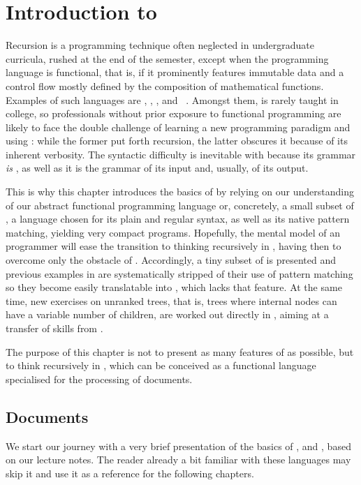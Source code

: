 \chapter{Introduction to \XSLT}

Recursion is a programming technique often neglected in undergraduate
curricula, rushed at the end of the semester, except when the
programming language is functional, that is, if it prominently
features immutable data and a control flow mostly defined by the
composition of mathematical functions. Examples of such languages are
\Scheme, \Haskell, \OCaml, \Erlang and \XSLT~\citep{Kay_2008}. Amongst
them, \XSLT is rarely taught in college, so professionals without
prior exposure to functional programming are likely to face the double
challenge of learning a new programming paradigm and using \XML: while
the former put forth recursion, the latter obscures it because of its
inherent verbosity. The syntactic difficulty is inevitable with \XSLT
because its grammar \emph{is} \XML, as well as it is the grammar of
its input and, usually, of its output.

This is why this chapter introduces the basics of \XSLT by relying on
our understanding of our abstract functional programming language or,
concretely, a small subset of \Erlang, a language chosen for its plain
and regular syntax, as well as its native pattern matching, yielding
very compact programs. Hopefully, the mental model of an \Erlang
programmer will ease the transition to thinking recursively in \XSLT,
having then to overcome only the obstacle of \XML. Accordingly, a tiny
subset of \XSLT is presented and previous examples in \Erlang are
systematically stripped of their use of pattern matching so they
become easily translatable into \XSLT, which lacks that feature. At
the same time, new exercises on unranked trees, that is, trees where
internal nodes can have a variable number of children, are worked out
directly in \XSLT, aiming at a transfer of skills from \Erlang.

The purpose of this chapter is not to present as many features of
\XSLT as possible, but to think recursively in \XSLT, which can be
conceived as a functional language specialised for the processing of
\XML documents.

\section{Documents}

We start our journey with a very brief presentation of the basics of
\XML, \HTML and \DTD, based on our lecture notes. The reader already a
bit familiar with these languages may skip it and use it as a
reference for the following chapters.

